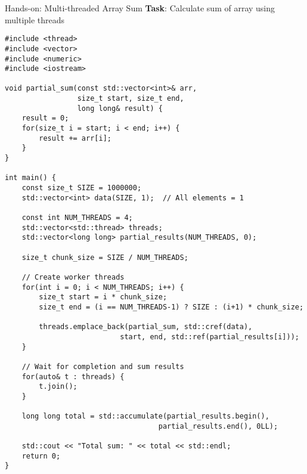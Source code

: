 \begin{frame}[fragile]{ Hands-on: Multi-threaded Array Sum}
	\textbf{Task}: Calculate sum of array using multiple threads

	\begin{verbatim}
#include <thread>
#include <vector>
#include <numeric>
#include <iostream>

void partial_sum(const std::vector<int>& arr,
                 size_t start, size_t end,
                 long long& result) {
    result = 0;
    for(size_t i = start; i < end; i++) {
        result += arr[i];
    }
}

int main() {
    const size_t SIZE = 1000000;
    std::vector<int> data(SIZE, 1);  // All elements = 1

    const int NUM_THREADS = 4;
    std::vector<std::thread> threads;
    std::vector<long long> partial_results(NUM_THREADS, 0);

    size_t chunk_size = SIZE / NUM_THREADS;

    // Create worker threads
    for(int i = 0; i < NUM_THREADS; i++) {
        size_t start = i * chunk_size;
        size_t end = (i == NUM_THREADS-1) ? SIZE : (i+1) * chunk_size;

        threads.emplace_back(partial_sum, std::cref(data),
                           start, end, std::ref(partial_results[i]));
    }

    // Wait for completion and sum results
    for(auto& t : threads) {
        t.join();
    }

    long long total = std::accumulate(partial_results.begin(),
                                    partial_results.end(), 0LL);

    std::cout << "Total sum: " << total << std::endl;
    return 0;
}
	\end{verbatim}
\end{frame}
